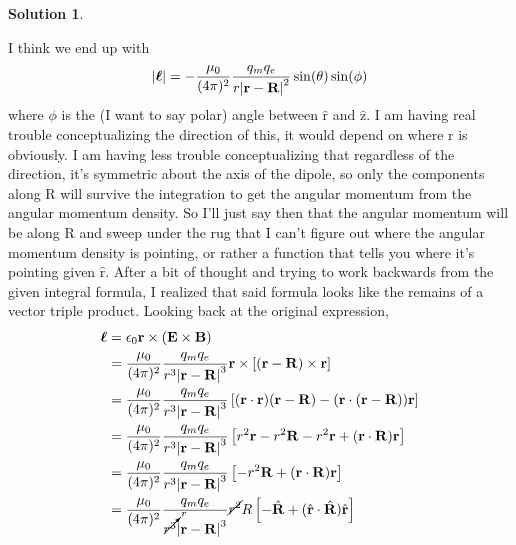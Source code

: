 \documentclass[10pt]{article}
\theoremstyle{definition}
\newtheorem{soln}{Solution}
\newcommand{\uv}[1]{\hat{\bv{{#1}}}}
\newcommand{\bv}[1]{\bm{\mathrm{#1}}}
\begin{document}
\begin{soln}
\begin{enumerate}[label=(\alph*)]
\begin{center}
          \end{center}
          I think we end up with
          $$\abs{\bv{\ell}}=-\frac{\mu_0}{(4\pi)^2}\frac{q_mq_e}{r\abs{\bv{r}-\bv{R}}^2}\sin(\theta)\sin(\phi)$$
          where $\phi$ is the (I want to say polar) angle between $\uv{r}$ and $\uv{z}$. I am having real trouble
          conceptualizing the direction of this, it would depend on where $\bv{r}$ is obviously. I am having less trouble conceptualizing
          that regardless of the direction, it's symmetric about the axis of the dipole, so only the components along $\bv{R}$ will survive
          the integration to get the angular momentum from the angular momentum density. So I'll just say then that the angular momentum will be along
          $\bv{R}$ and sweep under the rug that I can't figure out where the angular momentum density is pointing, or rather a function that tells you
          where it's pointing given $\uv{r}$. After a bit of thought and trying to work backwards from the given integral formula, I realized
          that said formula looks like the remains of a vector triple product. Looking back at the original expression,
          \begin{align*}
            \bv{\ell} & =\epsilon_0\bv{r}\times\left(\bv{E}\times\bv{B}\right)                                                                                           \\
                      & =\frac{\mu_0}{(4\pi)^2}\frac{q_mq_e}{r^3\abs{\bv{r}-\bv{R}}^3}\bv{r}\times\left[(\bv{r}-\bv{R})\times\bv{r}\right]                               \\
                      & =\frac{\mu_0}{(4\pi)^2}\frac{q_mq_e}{r^3\abs{\bv{r}-\bv{R}}^3}\left[(\bv{r}\cdot\bv{r})(\bv{r}-\bv{R})-(\bv{r}\cdot(\bv{r}-\bv{R}))\bv{r}\right] \\
                      & =\frac{\mu_0}{(4\pi)^2}\frac{q_mq_e}{r^3\abs{\bv{r}-\bv{R}}^3}\left[r^2\bv{r}-r^2\bv{R}-r^2\bv{r}+(\bv{r}\cdot\bv{R})\bv{r}\right]               \\
                      & =\frac{\mu_0}{(4\pi)^2}\frac{q_mq_e}{r^3\abs{\bv{r}-\bv{R}}^3}\left[-r^2\bv{R}+(\bv{r}\cdot\bv{R})\bv{r}\right]                                  \\
                      & =\frac{\mu_0}{(4\pi)^2}\frac{q_mq_e}{\cancelto{r}{r^3}\abs{\bv{r}-\bv{R}}^3}\cancel{r^2}R\left[-\uv{R}+(\uv{r}\cdot\uv{R})\uv{r}\right]          \\

\end{align*}
\end{enumerate}
\end{soln}
\end{document}
